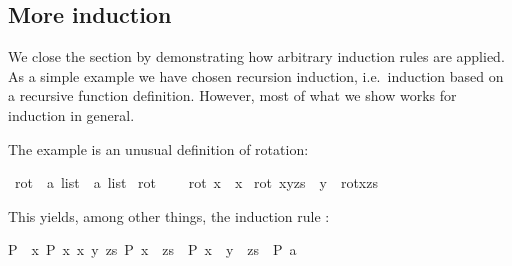 \begin{isabellebody}
\begin{isamarkuptext}
\subsection{More induction}

We close the section by demonstrating how arbitrary induction
rules are applied. As a simple example we have chosen recursion
induction, i.e.\ induction based on a recursive function
definition. However, most of what we show works for induction in
general.

The example is an unusual definition of rotation:%
\end{isamarkuptext}%
\isamarkuptrue%
\isamarkupfalse%
\ rot\ {}{}\ {}{}a\ list\ {}\ {}a\ list{}\ \isanewline
{}rot\ {}{}\ {}\ {}{}{}\ {}\isanewline
{}rot\ {}x{}\ {}\ {}x{}{}\ {}\isanewline
{}rot\ {}x{}y{}zs{}\ {}\ y\ {}\ rot{}x{}zs{}{}%
\begin{isamarkuptext}%
\noindent This yields, among other things, the induction rule
: \begin{isabelle}%
{}P\ {}{}{}\ {}x{}\ P\ {}x{}{}\ {}x\ y\ zs{}\ P\ {}x\ {}\ zs{}\ {}\ P\ {}x\ {}\ y\ {}\ zs{}{}\ {}\ P\ a{}%

\end{isabelle}
\end{isamarkuptext}
\end{isabellebody}
